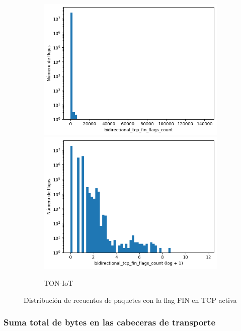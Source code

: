 \begin{figure}[H]
\begin{subfigure}[b]{0.32\textwidth}
        \includegraphics[width=\linewidth]{media/packet_pincer_toniot/bidirectional_tcp_fin_flags_count_linear_x_log_y.png}
        \includegraphics[width=\linewidth]{media/packet_pincer_toniot/bidirectional_tcp_fin_flags_count_log_x_log_y.png}
        \caption{TON-IoT}
    \end{subfigure}
       \caption{Distribución de recuentos de paquetes con la flag FIN en TCP activa}
       \label{fig:packet_pincer_bidirectional_tcp_fin_flags_count}
\end{figure}

\subsubsection{Suma total de bytes en las cabeceras de transporte}

